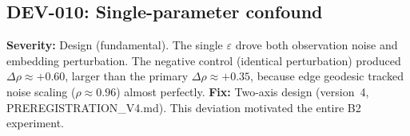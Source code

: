 \documentclass[11pt]{article}
\newcommand{\eps}{\varepsilon}
\begin{document}
\subsection*{DEV-010: Single-parameter confound}
\textbf{Severity:} Design (fundamental).
The single $\eps$ drove both observation noise and embedding
perturbation.  The negative control (identical perturbation)
produced $\Delta\rho \approx +0.60$, larger than the primary
$\Delta\rho \approx +0.35$, because edge geodesic tracked noise
scaling ($\rho \approx 0.96$) almost perfectly.
\textbf{Fix:} Two-axis design (version~4, PREREGISTRATION\_V4.md).
This deviation motivated the entire B2 experiment.
\end{document}
